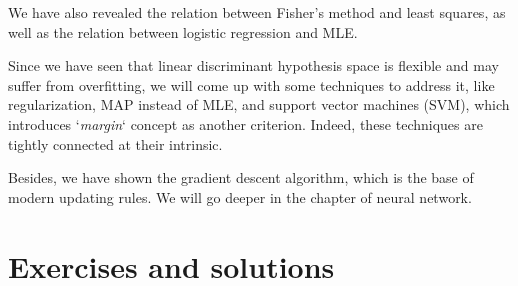 \documentclass{article}
\begin{document}
We have also revealed the relation between Fisher's method and least squares, as well as the relation between logistic regression and MLE.

Since we have seen that linear discriminant hypothesis space is flexible and may suffer from overfitting, we will come up with some techniques to address it, like regularization, MAP instead of MLE, and support vector machines (SVM), which introduces `\textit{margin}` concept as another criterion. Indeed, these techniques are tightly connected at their intrinsic.

Besides, we have shown the gradient descent algorithm, which is the base of modern updating rules. We will go deeper in the chapter of neural network.

\section{Exercises and solutions}
\end{document}
